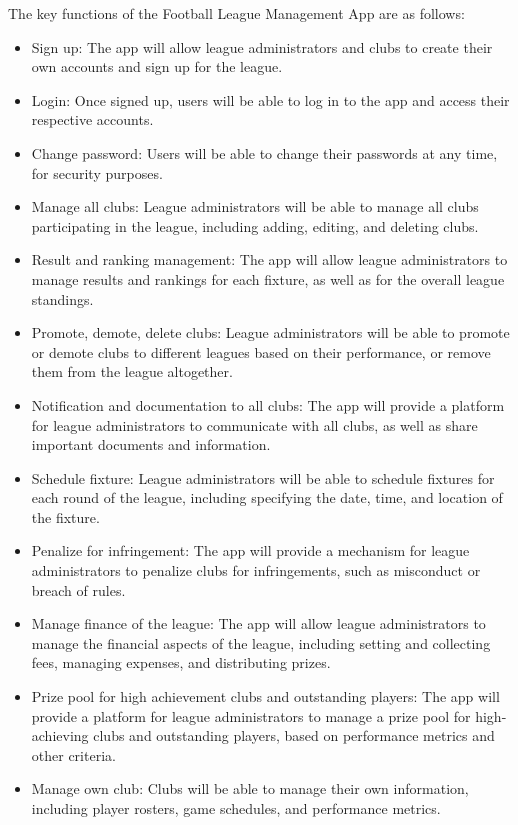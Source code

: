 \documentclass[12pt]{article}
\begin{document}
The key functions of the Football League Management App are as follows:
\begin{itemize}
    \item Sign up: The app will allow league administrators and clubs to create their own accounts and sign up for the league.

    \item Login: Once signed up, users will be able to log in to the app and access their respective accounts.

    \item Change password: Users will be able to change their passwords at any time, for security purposes.

    \item Manage all clubs: League administrators will be able to manage all clubs participating in the league, including adding, editing, and deleting clubs.

    \item Result and ranking management: The app will allow league administrators to manage results and rankings for each fixture, as well as for the overall league standings.

    \item Promote, demote, delete clubs: League administrators will be able to promote or demote clubs to different leagues based on their performance, or remove them from the league altogether.

    \item Notification and documentation to all clubs: The app will provide a platform for league administrators to communicate with all clubs, as well as share important documents and information.

    \item Schedule fixture: League administrators will be able to schedule fixtures for each round of the league, including specifying the date, time, and location of the fixture.

    \item Penalize for infringement: The app will provide a mechanism for league administrators to penalize clubs for infringements, such as misconduct or breach of rules.

    \item Manage finance of the league: The app will allow league administrators to manage the financial aspects of the league, including setting and collecting fees, managing expenses, and distributing prizes.

    \item Prize pool for high achievement clubs and outstanding players: The app will provide a platform for league administrators to manage a prize pool for high-achieving clubs and outstanding players, based on performance metrics and other criteria.

    \item Manage own club: Clubs will be able to manage their own information, including player rosters, game schedules, and performance metrics.
\end{itemize}
\end{document}
